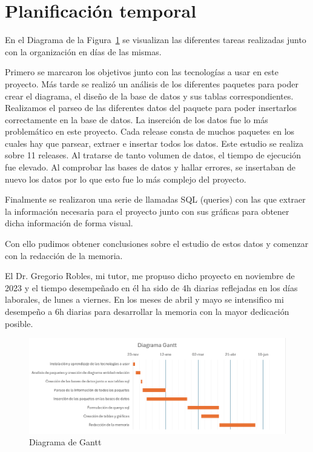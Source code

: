 \documentclass[a4paper, 12pt]{book}
\begin{document}
\section{Planificación temporal}
\label{sec:planificacion-temporal}

En el Diagrama de la Figura~\ref{fig:diagrama_gantt} se visualizan las diferentes tareas realizadas junto con la organización en días de las mismas. 

Primero se marcaron los objetivos junto con las tecnologías a usar en este proyecto.
Más tarde se realizó un análisis de los diferentes paquetes para poder crear el diagrama, el diseño de la base de datos y sus tablas correspondientes.
Realizamos el parseo de las diferentes datos del paquete para poder insertarlos correctamente en la base de datos.
La inserción de los datos fue lo más problemático en este proyecto. Cada release consta de muchos paquetes en los cuales hay que parsear, extraer e insertar todos los datos. Este estudio se realiza sobre 11 releases. Al tratarse de tanto volumen de datos, el tiempo de ejecución fue elevado. Al comprobar las bases de datos y hallar errores, se insertaban de nuevo los datos por lo que esto fue lo más complejo del proyecto.

Finalmente se realizaron una serie de llamadas SQL (queries) con las que extraer la información necesaria para el proyecto junto con sus gráficas para obtener dicha información de forma visual.

Con ello pudimos obtener conclusiones sobre el estudio de estos datos y comenzar con la redacción de la memoria.

El Dr. Gregorio Robles, mi tutor, me propuso dicho proyecto en noviembre de 2023 y el tiempo desempeñado en él ha sido de 4h diarias reflejadas en los días laborales, de lunes a viernes. En los meses de abril y mayo se intensifico mi desempeño a 6h diarias para desarrollar la memoria con la mayor dedicación posible.

\begin{figure}
	\centering
	\includegraphics[width=17cm, keepaspectratio]{img/Gantt.png}
	\caption{Diagrama de Gantt}
	\label{fig:diagrama_gantt}
\end{figure}
\end{document}
